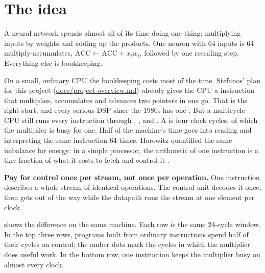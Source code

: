 \section{The idea}\label{sec:idea}

A neural network spends almost all of its time doing one thing: multiplying inputs by weights and adding up the products. One neuron with 64 inputs is 64 multiply-accumulates, $\mathrm{ACC} \gets \mathrm{ACC} + x_i w_i$, followed by one rescaling step. Everything else is bookkeeping.

On a small, ordinary CPU the bookkeeping costs most of the time. Stefanos' plan for this project (\url{docs/project-overview.md}) already gives the CPU a  instruction that multiplies, accumulates and advances two pointers in one go. That is the right start, and every serious DSP since the 1980s has one \citep{eyre2000evolution}. But a multicycle CPU still runs every instruction through , ,  and . A  is four clock cycles, of which the multiplier is busy for one. Half of the machine's time goes into reading and interpreting the same instruction 64 times. Horowitz quantified the same imbalance for energy: in a simple processor, the arithmetic of one instruction is a tiny fraction of what it costs to fetch and control it \citep{horowitz2014energy,dally2020domain}.

\begin{keyidea}
\textbf{Pay for control once per stream, not once per operation.} One instruction describes a whole stream of identical operations. The control unit decodes it once, then gets out of the way while the datapath runs the stream at one element per clock.
\end{keyidea}

 shows the difference on the same machine. Each row is the same 24-cycle window. In the top three rows, programs built from ordinary instructions spend half of their cycles on control; the amber dots mark the cycles in which the multiplier does useful work. In the bottom row, one  instruction keeps the multiplier busy on almost every clock.


